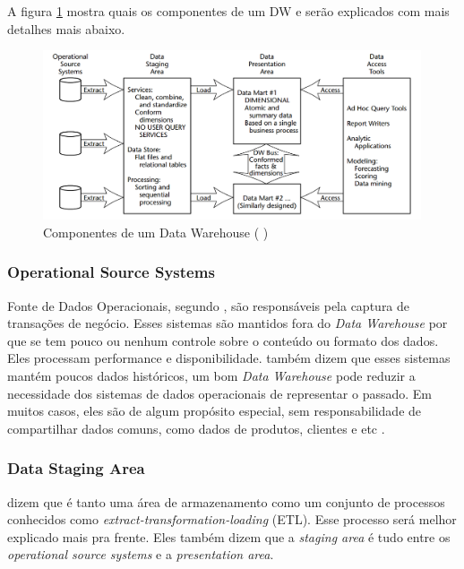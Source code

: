 A figura \ref{dwComponents} mostra quais os componentes de um DW e serão explicados com mais detalhes mais abaixo.
\begin{figure}[H]
\centering
\includegraphics[height=5cm]{imagens/componentes_DW.png}
\caption{Componentes de um Data Warehouse (\citeauthor{kimball2002} \citeyear{kimball2002})}
\label{dwComponents}
\end{figure}

\subsubsection{Operational Source Systems}
Fonte de Dados Operacionais, segundo , são responsáveis pela captura de transações de negócio. Esses sistemas são mantidos fora do \textit{Data Warehouse} por que se tem pouco ou nenhum controle sobre o conteúdo ou formato dos dados. Eles processam performance e disponibilidade.  também dizem que esses sistemas mantém poucos dados históricos, um bom \textit{Data Warehouse} pode reduzir a necessidade dos sistemas de dados operacionais de representar o passado. Em muitos casos, eles são de algum propósito especial, sem responsabilidade de compartilhar dados comuns, como dados de produtos, clientes e etc \citep{kimball2013}.

\subsubsection{Data Staging Area}
 dizem que é tanto uma área de armazenamento como um conjunto de processos conhecidos como \textit{extract-transformation-loading} (ETL). Esse processo será melhor explicado mais pra frente. Eles também dizem que a \textit{staging area} é tudo entre os \textit{operational source systems} e a \textit{presentation area}. 

